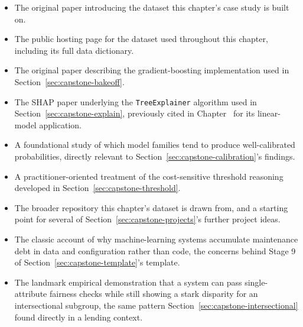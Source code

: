 \documentclass[../ai_in_finance]{subfiles}
\begin{document}
\begin{itemize}
    \item {} The original paper introducing the dataset this chapter's case study is built on.
    \item {} The public hosting page for the dataset used throughout this chapter, including its full data dictionary.
    \item {} The original paper describing the gradient-boosting implementation used in Section~\ref{sec:capstone-bakeoff}.
    \item {} The SHAP paper underlying the \texttt{TreeExplainer} algorithm used in Section~\ref{sec:capstone-explain}, previously cited in Chapter~ for its linear-model application.
    \item {} A foundational study of which model families tend to produce well-calibrated probabilities, directly relevant to Section~\ref{sec:capstone-calibration}'s findings.
    \item {} A practitioner-oriented treatment of the cost-sensitive threshold reasoning developed in Section~\ref{sec:capstone-threshold}.
    \item {} The broader repository this chapter's dataset is drawn from, and a starting point for several of Section~\ref{sec:capstone-projects}'s further project ideas.
    \item {} The classic account of why machine-learning systems accumulate maintenance debt in data and configuration rather than code, the concerns behind Stage 9 of Section~\ref{sec:capstone-template}'s template.
    \item {} The landmark empirical demonstration that a system can pass single-attribute fairness checks while still showing a stark disparity for an intersectional subgroup, the same pattern Section~\ref{sec:capstone-intersectional} found directly in a lending context.
\end{itemize}
\end{document}
